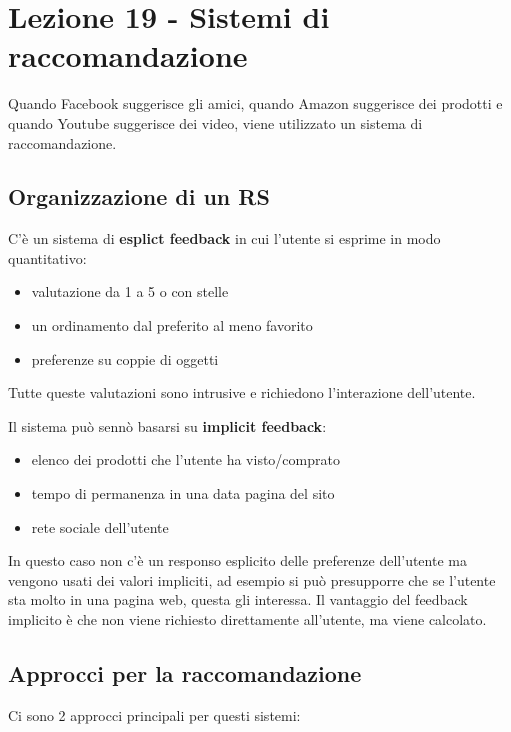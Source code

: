 \section{Lezione 19 - Sistemi di
raccomandazione}\label{lezione-19---sistemi-di-raccomandazione}

Quando Facebook suggerisce gli amici, quando Amazon suggerisce dei
prodotti e quando Youtube suggerisce dei video, viene utilizzato un
sistema di raccomandazione.

\subsection{Organizzazione di un RS}\label{organizzazione-di-un-rs}

C'è un sistema di \textbf{esplict feedback} in cui l'utente si esprime in modo
quantitativo:

\begin{itemize}
\item
  valutazione da 1 a 5 o con stelle
\item
  un ordinamento dal preferito al meno favorito
\item
  preferenze su coppie di oggetti
\end{itemize}

Tutte queste valutazioni sono intrusive e richiedono l'interazione
dell'utente.

Il sistema può sennò basarsi su \textbf{implicit feedback}:

\begin{itemize}
\item
  elenco dei prodotti che l'utente ha visto/comprato
\item
  tempo di permanenza in una data pagina del sito
\item
  rete sociale dell'utente
\end{itemize}

In questo caso non c'è un responso esplicito delle preferenze
dell'utente ma vengono usati dei valori impliciti, ad esempio si può
presupporre che se l'utente sta molto in una pagina web, questa gli
interessa. 
Il vantaggio del feedback implicito è che non viene richiesto
direttamente all'utente, ma viene calcolato.

\subsection{Approcci per la raccomandazione}\label{approcci-per-la-raccomandazione}

Ci sono 2 approcci principali per questi sistemi:

